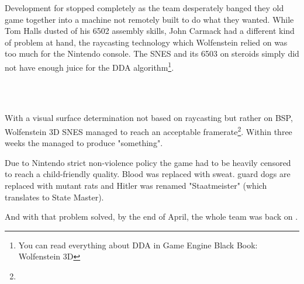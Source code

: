 \par
 Development for \doom stopped completely as the team desperately banged they old game together into a machine not remotely built to do what they wanted. While Tom Halls dusted of his 6502 assembly skills, John Carmack had a different kind of problem at hand, the raycasting technology which Wolfenstein relied on was too much for the Nintendo console. The SNES and its 6503 on steroids simply did not have enough juice for the DDA algorithm\footnote{You can read everything about DDA in Game Engine Black Book: Wolfenstein 3D}.\\%
\par



\\
\par
{}\\
With a visual surface determination not based on raycasting but rather on BSP, Wolfenstein 3D SNES managed to reach an acceptable framerate\footnote{}. Within three weeks the managed to produce "something".\\
\par
Due to Nintendo strict non-violence policy the game had to be heavily censored to reach a child-friendly quality. Blood was replaced with sweat. guard dogs are replaced with mutant rats and Hitler was renamed "Staatmeister" (which translates to State Master).\\
\par
And with that problem solved, by the end of April, the whole team was back on \doom.
\pagebreak

